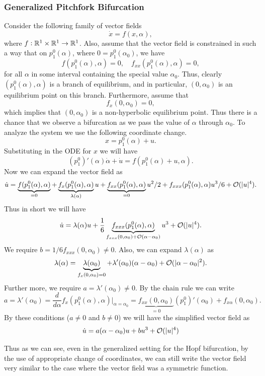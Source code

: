 \subsubsection*{Generalized Pitchfork Bifurcation}
Consider the following family of vector fields
\[ \dot{x} = f(x,\alpha), \]
where $f: \mathbb{R}^1 \times \mathbb{R}^1 \to \mathbb{R}^1$. Also, assume that the vector field is constrained in such a way that on $p^0_1(\alpha)$, where $0 = p^0_1(\alpha_0)$, we have
\[ f(p^0_1(\alpha),\alpha) = 0,\quad f_{xx}(p^0_1(\alpha),\alpha) = 0, \]
for all $\alpha$ in some interval containing the special value $\alpha_0$. Thus, clearly $(p^0_1(\alpha),\alpha)$ is a branch of equilibrium, and in particular, $(0,\alpha_0)$ is an equilibrium point on this branch. Furthermore, assume that 
\[ f_x(0,\alpha_0) = 0, \] 
which implies that $(0,\alpha_0)$ is a non-hyperbolic equilibrium point. Thus there is a chance that we observe a bifurcation as we pass the value of $\alpha$ through $\alpha_0$. To analyze the system we use the following coordinate change.
\[ x = p^0_1(\alpha) + u. \]
Substituting in the ODE for $x$ we will have
\[ (p^0_1)'(\alpha)\dot{\alpha} + \dot{u} = f(p^0_1(\alpha) + u,\alpha).\]
Now we can expand the vector field as
\[ \dot{u} = \underbrace{f(p^0_1(\alpha),\alpha)}_{=0} + \underbrace{f_x(p^0_1(\alpha),\alpha)}_{\lambda(\alpha)}u + \underbrace{f_{xx}(p^0_1(\alpha),\alpha)}_{=0}u^2/2 + f_{xxx}(p^0_1(\alpha),\alpha)u^3/6 + \mathcal{O}(|u|^4). \]
Thus in short we will have
\[ \dot{u} = \lambda(\alpha)u + \frac{1}{6}\underbrace{f_{xxx}(p^0_1(\alpha),\alpha)}_{f_{xxx}(0,\alpha_0) + \mathcal{O}(\alpha-\alpha_0)} u^3 + \mathcal{O}(|u|^4). \]
We require $b = 1/6 f_{xxx}(0,\alpha_0) \neq 0$. Also, we can expand $\lambda(\alpha)$ as
\[ \lambda(\alpha) = \underbrace{\lambda(\alpha_0)}_{f_x(0,\alpha_0)=0} + \lambda'(\alpha_0)(\alpha-\alpha_0) + \mathcal{O}(|\alpha-\alpha_0|^2). \]
Further more, we require $a  = \lambda'(\alpha_0) \neq  0$. By the chain rule we can write
\[  a = \lambda'(\alpha_0) = \frac{d}{d\alpha} f_x(p^0_1(\alpha),\alpha) \big|_{\alpha=\alpha_0} = \underbrace{f_{xx}(0,\alpha_0)}_{=0}(p^0_1)'(\alpha_0) + f_{x\alpha}(0,\alpha_0).  \] 
By these conditions ($a \neq 0$ and $b\neq 0$) we will have the simplified vector field as
\[ \dot{u} = a(\alpha - \alpha_0) u + bu^3 + \mathcal{O}(|u|^4) \]

Thus as we can see, even in the generalized setting for the Hopf bifurcation, by the use of appropriate change of coordinates, we can still write the vector field very similar to the case where the vector field was a symmetric function.



